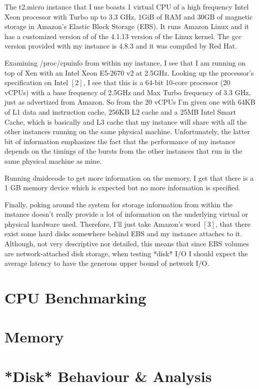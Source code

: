 \documentclass[12pt]{article}
\begin{document}
The t2.micro instance that I use boasts 1 virtual
CPU of a high frequency Intel Xeon processor with Turbo up
to 3.3 GHz, 1GiB of RAM and 30GB of magnetic storage in
Amazon's Elastic Block Storage (EBS). It runs Amazon Linux
and it has a customized version of of the 4.1.13 version
of the Linux kernel. The gcc version provided with my instance
is 4.8.3 and it was compiled by Red Hat.

Examining /proc/cpuinfo from within my instance, I see that
I am running on top of Xen with an Intel Xeon E5-2670 v2 at
2.5GHz. Looking up the processor's specification on Intel
$[2]$, I see that this is a 64-bit 10-core processor (20 vCPUs)
with a base frequency of 2.5GHz and Max Turbo frequency
of 3.3 GHz, just as advertized from Amazon. So from the
20 vCPUs I'm given one with 64KB of L1 data and instruction
cache, 256KB L2 cache and a 25MB Intel Smart Cache, which is
basically and L3 cache that my instance will share with
all the other instances running on the same physical
machine. Unfortunately, the latter bit of information
emphasizes the fact that the performance of my instance
depends on the timings of the bursts from the other instances
that run in the same physical machine as mine.

Running dmidecode to get more information on the memory,
I get that there is a 1 GB memory device which is expected
but no more information is specified.

Finally, poking around the system for storage information
from within the instance doesn't really provide a lot of
information on the underlying virtual or physical hardware
used. Therefore, I'll just take Amazon's word $[3]$, that
there exist some hard disks somewhere behind EBS and my
instance attaches to it. Although, not very descriptive
nor detailed, this means that since EBS volumes are
network-attached disk storage, when testing *disk* I/O
I should expect the average latency to have the
generous upper bound of network I/O.

\section{CPU Benchmarking}

\section{Memory}

\section{*Disk* Behaviour \& Analysis}
\end{document}
